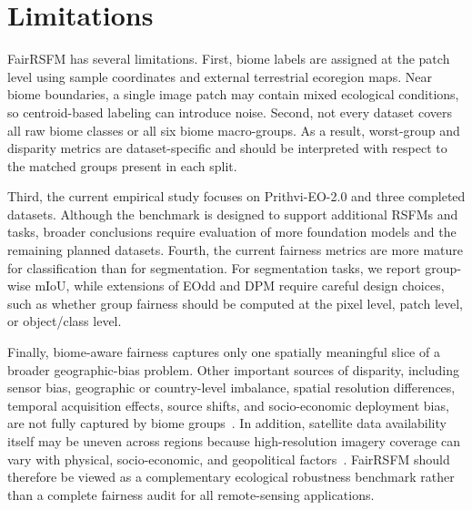 \documentclass[10pt,twocolumn,letterpaper]{article}
\newcommand{\method}{FairRSFM\xspace}
\begin{document}


\section{Limitations}

\method has several limitations. First, biome labels are assigned at the patch level using sample coordinates and external terrestrial ecoregion maps. Near biome boundaries, a single image patch may contain mixed ecological conditions, so centroid-based labeling can introduce noise. Second, not every dataset covers all raw biome classes or all six biome macro-groups. As a result, worst-group and disparity metrics are dataset-specific and should be interpreted with respect to the matched groups present in each split.

Third, the current empirical study focuses on Prithvi-EO-2.0 and three completed datasets. Although the benchmark is designed to support additional RSFMs and tasks, broader conclusions require evaluation of more foundation models and the remaining planned datasets. Fourth, the current fairness metrics are more mature for classification than for segmentation. For segmentation tasks, we report group-wise mIoU, while extensions of EOdd and DPM require careful design choices, such as whether group fairness should be computed at the pixel level, patch level, or object/class level.

Finally, biome-aware fairness captures only one spatially meaningful slice of a broader geographic-bias problem. Other important sources of disparity, including sensor bias, geographic or country-level imbalance, spatial resolution differences, temporal acquisition effects, source shifts, and socio-economic deployment bias, are not fully captured by biome groups~\cite{geobs2025,earthshift2026,coveragebias_satellite}. In addition, satellite data availability itself may be uneven across regions because high-resolution imagery coverage can vary with physical, socio-economic, and geopolitical factors~\cite{coveragebias_satellite}. \method should therefore be viewed as a complementary ecological robustness benchmark rather than a complete fairness audit for all remote-sensing applications.
\end{document}
